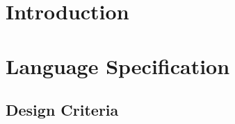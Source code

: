 


\frontmatter %
\newcommand{\ind}[1]{}

\ind{FormaliaForside}
\cleardoublepage %

\ind{FormaliaTitelblad}
\cleardoublepage
\ind{FormaliaProlog.tex}
\\\\
\ind{FormaliaUnderskriftsside.tex}
\cleardoublepage



\setlength\parskip{0ex} %
\tableofcontents* %
\setlength{\parskip}{3mm} %



\label{marker}
\mainmatter

\pagestyle{custom}

\renewcommand{\ind}[1]{}
\chapter{Introduction}
\ind{Introduction}
\ind{EnviromentForThisProject}
\ind{SolutionInBars}
\ind{ProblemStatement}
\ind{ReportStructure}

\renewcommand{\ind}[1]{}
\chapter{Language Specification}
\label{chap:lanspec}
\ind{ParadigmsOfProgrammingLanguage}
\section{Design Criteria}
\ind{ProgrammingAnArduino-basedDrinks-machine}
\ind{DesignCriteriaInThisProject}
